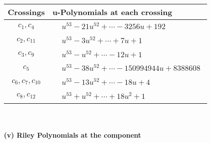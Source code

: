 \documentclass[1p]{elsarticle_modified}
\theoremstyle{definition}
\begin{document}
\begin{tabular}{m{50pt}|m{274pt}}
Crossings & \hspace{64pt}u-Polynomials at each crossing \\
\hline $$\begin{aligned}c_{1},c_{4}\end{aligned}$$&$\begin{aligned}
&u^{53}-21 u^{52}+\cdots-3256 u+192
\end{aligned}$\\
\hline $$\begin{aligned}c_{2},c_{11}\end{aligned}$$&$\begin{aligned}
&u^{53}-3 u^{52}+\cdots+7 u+1
\end{aligned}$\\
\hline $$\begin{aligned}c_{3},c_{9}\end{aligned}$$&$\begin{aligned}
&u^{53}- u^{52}+\cdots-12 u+1
\end{aligned}$\\
\hline $$\begin{aligned}c_{5}\end{aligned}$$&$\begin{aligned}
&u^{53}-38 u^{52}+\cdots-150994944 u+8388608
\end{aligned}$\\
\hline $$\begin{aligned}c_{6},c_{7},c_{10}\end{aligned}$$&$\begin{aligned}
&u^{53}-13 u^{52}+\cdots-18 u+4
\end{aligned}$\\
\hline $$\begin{aligned}c_{8},c_{12}\end{aligned}$$&$\begin{aligned}
&u^{53}+u^{52}+\cdots+18 u^2+1
\end{aligned}$\\
\hline
\end{tabular}\\~\\
\newpage\renewcommand{\arraystretch}{1}
\flushleft \textbf{(v) Riley Polynomials at the component}\newline \\
\end{document}

